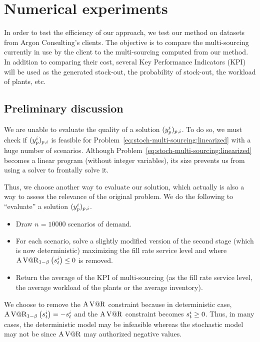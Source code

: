 \chapter{Numerical experiments}
\label{chap:multi-sourcing:numerical-experiments}


In order to test the efficiency of our approach, we test our method on datasets from Argon Consulting’s clients.
The objective is to compare the multi-sourcing currently in use by the client to the multi-sourcing computed from our method.
In addition to comparing their cost, several Key Performance Indicators (KPI) will be used as the generated stock-out, the probability of stock-out, the workload of plants, etc.


\section{Preliminary discussion}


We are unable to evaluate the quality of a solution $(y_p^i)_{p,i}$.
To do so, we must check if $(y_p^i)_{p,i}$ is feasible for Problem~\eqref{eq:stoch-multi-sourcing:linearized} with a huge number of scenarios.
Although Problem~\eqref{eq:stoch-multi-sourcing:linearized} becomes a linear program (without integer variables), its size prevents us from using a solver to frontally solve it.




Thus, we choose another way to evaluate our solution, which actually is also a way to assess the relevance of the original problem.
We do the following to ``evaluate'' a solution $(y_p^i)_{p,i}$.
\begin{itemize}
  \item Draw $n=10000$ scenarios of demand.
  \item For each scenario, solve a slightly modified version of the second stage (which is now deterministic) maximizing the fill rate service level and where $\AVaR_{1-\servicelvl}\bracket{\inventory_t^i}\le0$ is removed.
  \item Return the average of the KPI of multi-sourcing (as the fill rate service level, the average workload of the plants or the average inventory).
\end{itemize}


We choose to remove the $\operatorname{A\operatorname{V@R}}$ constraint because in deterministic case, $\AVaR_{1-\servicelvl}\bracket{\inventory_t^i}=-\inventory_t^i$ and the $\operatorname{A\operatorname{V@R}}$ constraint becomes $s_t^i\ge0$.
Thus, in many cases, the deterministic model may be infeasible whereas the stochastic model may not be since $\operatorname{A\operatorname{V@R}}$ may authorized negative values.


